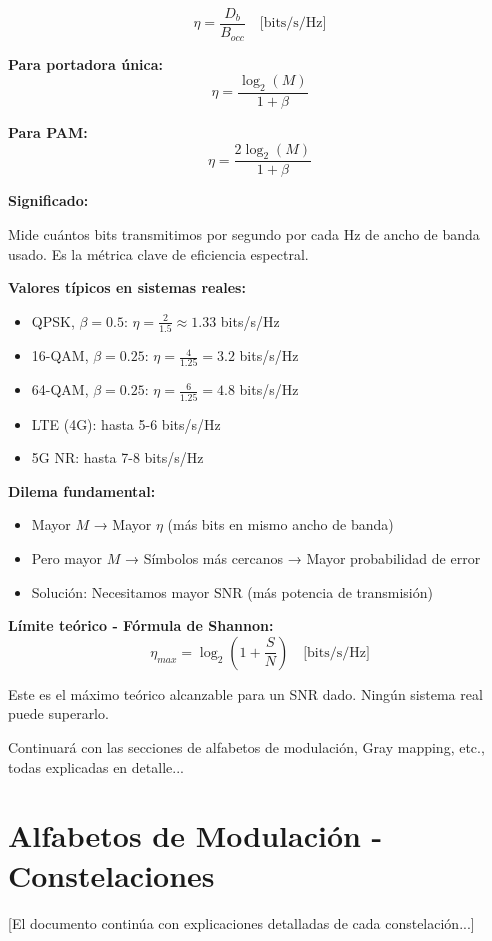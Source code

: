 \documentclass[11pt,a4paper]{article}
\begin{document}
\begin{tcolorbox}[colback=amarillo!40,colframe=azuloscuro,title=\textbf{Eficiencia espectral}]
$$\boxed{\eta = \frac{D_b}{B_{occ}} \quad \text{[bits/s/Hz]}}$$

\textbf{Para portadora única:}
$$\boxed{\eta = \frac{\log_2(M)}{1+\beta}}$$

\textbf{Para PAM:}
$$\boxed{\eta = \frac{2\log_2(M)}{1+\beta}}$$

\textbf{Significado:}

Mide cuántos bits transmitimos por segundo por cada Hz de ancho de banda usado. Es la métrica clave de eficiencia espectral.

\textbf{Valores típicos en sistemas reales:}
\begin{itemize}
\item QPSK, $\beta=0.5$: $\eta = \frac{2}{1.5} \approx 1.33$ bits/s/Hz
\item 16-QAM, $\beta=0.25$: $\eta = \frac{4}{1.25} = 3.2$ bits/s/Hz
\item 64-QAM, $\beta=0.25$: $\eta = \frac{6}{1.25} = 4.8$ bits/s/Hz
\item LTE (4G): hasta 5-6 bits/s/Hz
\item 5G NR: hasta 7-8 bits/s/Hz
\end{itemize}

\textbf{Dilema fundamental:}
\begin{itemize}
\item Mayor $M$ → Mayor $\eta$ (más bits en mismo ancho de banda)
\item Pero mayor $M$ → Símbolos más cercanos → Mayor probabilidad de error
\item Solución: Necesitamos mayor SNR (más potencia de transmisión)
\end{itemize}

\textbf{Límite teórico - Fórmula de Shannon:}
$$\eta_{max} = \log_2\left(1 + \frac{S}{N}\right) \quad \text{[bits/s/Hz]}$$

Este es el máximo teórico alcanzable para un SNR dado. Ningún sistema real puede superarlo.
\end{tcolorbox}

Continuará con las secciones de alfabetos de modulación, Gray mapping, etc., todas explicadas en detalle...

\newpage

\section{Alfabetos de Modulación - Constelaciones}

[El documento continúa con explicaciones detalladas de cada constelación...]
\end{document}
